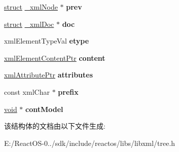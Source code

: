 \begin{DoxyCompactItemize}
\hyperlink{interfacestruct}{struct} \hyperlink{struct__xml_node}{\+\_\+xml\+Node} $\ast$ {\bfseries prev}
\item 
\mbox{\label{struct__xml_element_a89d834f3cd5e42d21d59e7476cf5b7f9}} 
\hyperlink{interfacestruct}{struct} \hyperlink{struct__xml_doc}{\+\_\+xml\+Doc} $\ast$ {\bfseries doc}
\item 
\mbox{\label{struct__xml_element_a3f7566085877a63b728c8596438a9540}} 
xml\+Element\+Type\+Val {\bfseries etype}
\item 
\mbox{\label{struct__xml_element_ac934ce51a0a220c511c1700c3694e0e7}} 
\hyperlink{struct__xml_element_content}{xml\+Element\+Content\+Ptr} {\bfseries content}
\item 
\mbox{\label{struct__xml_element_a45468a87059e899da068a6cc04e6a943}} 
\hyperlink{struct__xml_attribute}{xml\+Attribute\+Ptr} {\bfseries attributes}
\item 
\mbox{\label{struct__xml_element_a5c499467a4b209f6881220594db90650}} 
const xml\+Char $\ast$ {\bfseries prefix}
\item 
\mbox{\label{struct__xml_element_a8f4ac69355ce0e5b4ddab81d91116302}} 
\hyperlink{interfacevoid}{void} $\ast$ {\bfseries cont\+Model}
\end{DoxyCompactItemize}


该结构体的文档由以下文件生成\+:\begin{DoxyCompactItemize}
\item 
E\+:/\+React\+O\+S-\/0../sdk/include/reactos/libs/libxml/tree.\+h\end{DoxyCompactItemize}
